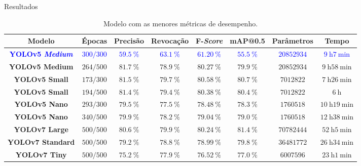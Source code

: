 \begin{frame}[shrink=8]{Resultados}
\begin{table}[h!]
\caption{Modelo com as menores métricas de desempenho.} \label{tab:resultadosExperimentais}
\begin{footnotesize}
\begin{tabular}{cccccccc}
\toprule
\textbf{Modelo} & \textbf{Épocas} &\textbf{Precisão} & \textbf{Revocação} & \textbf{F-\emph{Score}} & \textbf{mAP@0.5} & \textbf{Parâmetros} & \textbf{Tempo}\\
\midrule
\textcolor{blue}{\textbf{YOLOv5 \emph{Medium}}} & \textcolor{blue}{$300/300$} & \textcolor{blue}{$\SI{59,5}{\percent}$} & \textcolor{blue}{$\SI{63,1}{\percent}$} & \textcolor{blue}{$\SI{61,20}{\percent}$} & \textcolor{blue}{$\SI{55,5}{\percent}$} & \textcolor{blue}{$\num{20852934}$} & \textcolor{blue}{$\SI{9}{\hour}\SI{7}{\minute}$}\\
\textbf{YOLOv5 Medium} & $264/500$ & $\SI{81,7}{\percent}$ & $\SI{78,9}{\percent}$ & $\SI{80,27}{\percent}$ & $\SI{79,9}{\percent}$ & $\num{20852934}$ & $\SI{9}{\hour}\SI{58}{\minute}$\\
\textbf{YOLOv5 Small} & $173/300$ & $\SI{81,5}{\percent}$ & $\SI{79,7}{\percent}$ & $\SI{80,58}{\percent}$ & $\SI{80,7}{\percent}$ & $\num{7012822}$ & $\SI{7}{\hour}\SI{26}{\minute}$\\
\textbf{YOLOv5 Small} & $194/500$ & $\SI{81,4}{\percent}$ & $\SI{79,4}{\percent}$ & $\SI{80,38}{\percent}$ & $\SI{80,4}{\percent}$ & $\num{7012822}$ & $\SI{6}{\hour}$\\
\textbf{YOLOv5 Nano} & $293/300$ & $\SI{79,5}{\percent}$ & $\SI{77,5}{\percent}$ & $\SI{78,48}{\percent}$ & $\SI{78,3}{\percent}$ & $\num{1760518}$ & $\SI{10}{\hour}\SI{19}{\minute}$\\
\textbf{YOLOv5 Nano} & $340/500$ & $\SI{79,9}{\percent}$ & $\SI{78,2}{\percent}$ & $\SI{79,04}{\percent}$ & $\SI{79,0}{\percent}$ & $\num{1760518}$ & $\SI{12}{\hour}\SI{38}{\minute}$\\
\midrule
\textbf{YOLOv7 Large} & $500/500$ & $\SI{80,6}{\percent}$ & $\SI{79,9}{\percent}$ & $\SI{80,24}{\percent}$ & $\SI{81,4}{\percent}$ & $\num{70782444}$ & $\SI{52}{\hour}\SI{5}{\minute}$\\
\textbf{YOLOv7 Standard} & $500/500$ & $\SI{79,2}{\percent}$ & $\SI{78,8}{\percent}$ & $\SI{78,99}{\percent}$ & $\SI{79,8}{\percent}$ & $\num{36481772}$ & $\SI{26}{\hour}\SI{34}{\minute}$\\
\textbf{YOLOv7 Tiny} & $500/500$ & $\SI{75,2}{\percent}$ & $\SI{77,9}{\percent}$ & $\SI{76,52}{\percent}$ & $\SI{77,0}{\percent}$ & $\num{6007596}$ & $\SI{23}{\hour}\SI{1}{\minute}$\\
\bottomrule
\end{tabular}
\end{footnotesize}
\end{table}
\end{frame}

